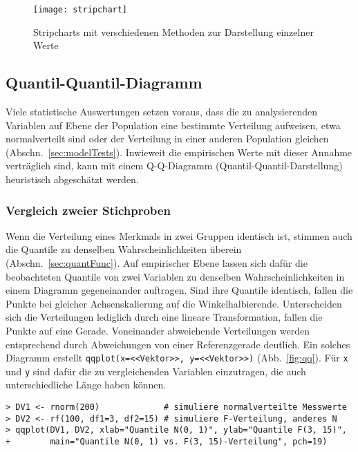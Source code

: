 \begin{figure}[ht]
\centering
\texttt{[image: stripchart]}
\vspace*{-0.5em}
\caption{Stripcharts mit verschiedenen Methoden zur Darstellung einzelner Werte}
\label{fig:stripchart}
\end{figure}

\subsection{Quantil-Quantil-Diagramm}
\label{sec:qq}

Viele statistische Auswertungen setzen voraus, dass die zu analysierenden Variablen auf Ebene der Population eine bestimmte Verteilung aufweisen, etwa normalverteilt sind oder der Verteilung in einer anderen Population gleichen (Abschn.\ \ref{sec:modelTests}). Inwieweit die empirischen Werte mit dieser Annahme verträglich sind, kann mit einem Q-Q-Diagramm (Quantil-Quantil-Darstellung) heuristisch abgeschätzt werden.

\subsubsection{Vergleich zweier Stichproben}

Wenn die Verteilung eines Merkmals in zwei Gruppen identisch ist, stimmen auch die Quantile zu denselben Wahrscheinlichkeiten überein (Abschn.\ \ref{sec:quantFunc}). Auf empirischer Ebene lassen sich dafür die beobachteten Quantile von zwei Variablen zu denselben Wahrscheinlichkeiten in einem Diagramm gegeneinander auftragen. Sind ihre Quantile identisch, fallen die Punkte bei gleicher Achsenskalierung auf die Winkelhalbierende. Unterscheiden sich die Verteilungen lediglich durch eine lineare Transformation, fallen die Punkte auf eine Gerade. Voneinander abweichende Verteilungen werden entsprechend durch Abweichungen von einer Referenzgerade deutlich. Ein solches Diagramm erstellt \lstinline!qqplot(x=<<Vektor>>, y=<<Vektor>>)! (Abb.\ \ref{fig:qq}). Für \lstinline!x! und \lstinline!y! sind dafür die zu vergleichenden Variablen einzutragen, die auch unterschiedliche Länge haben können.
\begin{lstlisting}
> DV1 <- rnorm(200)             # simuliere normalverteilte Messwerte 
> DV2 <- rf(100, df1=3, df2=15) # simuliere F-Verteilung, anderes N
> qqplot(DV1, DV2, xlab="Quantile N(0, 1)", ylab="Quantile F(3, 15)",
+        main="Quantile N(0, 1) vs. F(3, 15)-Verteilung", pch=19)
\end{lstlisting}

